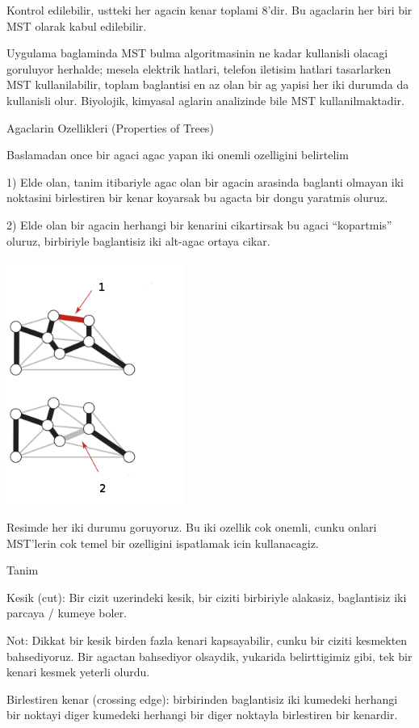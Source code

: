\documentclass[12pt,fleqn]{article}\usepackage{../common}
\begin{document}
Kontrol edilebilir, ustteki her agacin kenar toplami 8'dir. Bu agaclarin
her biri bir MST olarak kabul edilebilir.

Uygulama baglaminda MST bulma algoritmasinin ne kadar kullanisli olacagi
goruluyor herhalde; mesela elektrik hatlari, telefon iletisim hatlari
tasarlarken MST kullanilabilir, toplam baglantisi en az olan bir ag yapisi
her iki durumda da kullanisli olur. Biyolojik, kimyasal aglarin analizinde
bile MST kullanilmaktadir.

Agaclarin Ozellikleri (Properties of Trees)

Baslamadan once bir agaci agac yapan iki onemli ozelligini belirtelim

1) Elde olan, tanim itibariyle agac olan bir agacin arasinda baglanti
olmayan iki noktasini birlestiren bir kenar koyarsak bu agacta bir dongu
yaratmis oluruz.

2) Elde olan bir agacin herhangi bir kenarini cikartirsak bu agaci
``kopartmis'' oluruz, birbiriyle baglantisiz iki alt-agac ortaya cikar.

\includegraphics[height=8cm]{graph_prop.png}

Resimde her iki durumu goruyoruz. Bu iki ozellik cok onemli, cunku onlari
MST'lerin cok temel bir ozelligini ispatlamak icin kullanacagiz.

Tanim

Kesik (cut): Bir cizit uzerindeki kesik, bir ciziti birbiriyle alakasiz,
baglantisiz iki parcaya / kumeye boler. 

Not: Dikkat bir kesik birden fazla kenari kapsayabilir, cunku bir ciziti
kesmekten bahsediyoruz. Bir agactan bahsediyor olsaydik, yukarida
belirttigimiz gibi, tek bir kenari kesmek yeterli olurdu.

Birlestiren kenar (crossing edge): birbirinden baglantisiz iki kumedeki
herhangi bir noktayi diger kumedeki herhangi bir diger noktayla birlestiren
bir kenardir.
\end{document}
